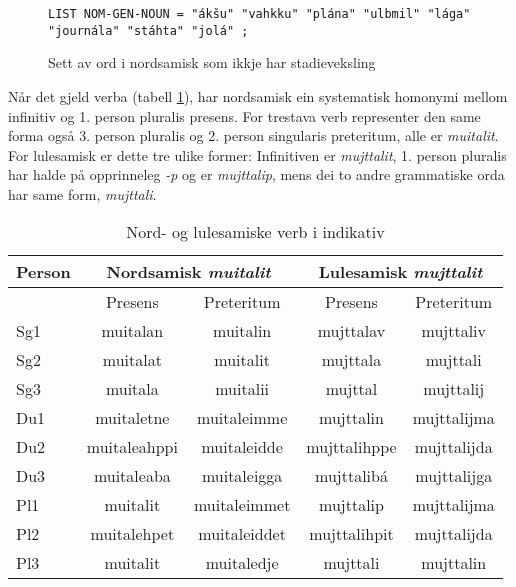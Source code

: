 \documentclass[a4paper,nynorsk]{article}
\begin{document}
\begin{figure}[htbp]
\begin{center}
\begin{verbatim}
LIST NOM-GEN-NOUN = "ákšu" "vahkku" "plána" "ulbmil" "lága" "journála" "stáhta" "jolá" ;
\end{verbatim}
\caption{Sett av ord i nordsamisk som ikkje har stadieveksling}
\label{nomgenlist}
\end{center}
\end{figure}

Når det gjeld verba (tabell \ref{verb}), har nordsamisk ein systematisk homonymi mellom infinitiv og 1. person pluralis presens. For trestava verb representer den same forma også 3. person pluralis og 2. person singularis preteritum, alle er \emph{muitalit}. For lulesamisk er dette tre ulike former: Infinitiven er \emph{mujttalit}, 1. person pluralis har halde på opprinneleg \emph{-p} og er \emph{mujttalip}, mens dei to andre grammatiske orda har same form, \emph{mujttali}.%

\begin{table}[htdp]
\caption{Nord- og lulesamiske verb i indikativ}
\begin{center}
\begin{tabular}{|l|c|c||c|c|}
\hline
Person & \multicolumn{2}{|c||}{Nordsamisk \textit{muitalit}} & \multicolumn{2}{|c|}{Lulesamisk \textit{mujttalit}} \\
\hline
 & Presens & Preteritum & Presens & Preteritum \\
\hline \hline 
Sg1 & muitalan & muitalin &  mujttalav & mujttaliv \\
\hline
Sg2 & muitalat & muitalit & mujttala & mujttali \\
\hline
Sg3 & muitala & muitalii & mujttal & mujttalij \\
\hline
\hline
Du1  & muitaletne & muitaleimme & mujttalin & mujttalijma \\
\hline
Du2 & muitaleahppi & muitaleidde & mujttalihppe & mujttalijda \\
\hline
Du3 & muitaleaba & muitaleigga & mujttalibá & mujttalijga \\
\hline
\hline
Pl1  & muitalit & muitaleimmet & mujttalip & mujttalijma \\
\hline
Pl2 & muitalehpet & muitaleiddet & mujttalihpit & mujttalijda  \\
\hline
Pl3 & muitalit & muitaledje & mujttali & mujttalin \\
\hline
\hline
\end{tabular}
\end{center}
\label{verb}
\end{table}%
\end{document}

